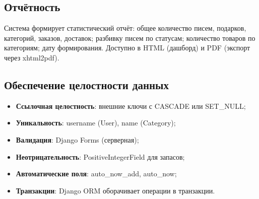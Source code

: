 \documentclass[14pt,a4paper]{extarticle}
\begin{document}
\begin{table}[H]
\centering
\caption{Модели Inventory, GiftOrder, Delivery}
\label{tab:dict_other}
\small
{}
\end{table}

\subsection{Отчётность}

Система формирует статистический отчёт: общее количество писем, подарков, категорий, заказов, доставок; разбивку писем по статусам; количество товаров по категориям; дату формирования. Доступно в HTML (дашборд) и PDF (экспорт через xhtml2pdf).

\subsection{Обеспечение целостности данных}

\begin{itemize}
    \item \textbf{Ссылочная целостность}: внешние ключи с CASCADE или SET\_NULL;
    \item \textbf{Уникальность}: username (User), name (Category);
    \item \textbf{Валидация}: Django Forms (серверная);
    \item \textbf{Неотрицательность}: PositiveIntegerField для запасов;
    \item \textbf{Автоматические поля}: auto\_now\_add, auto\_now;
    \item \textbf{Транзакции}: Django ORM оборачивает операции в транзакции.
\end{itemize}
\end{document}
